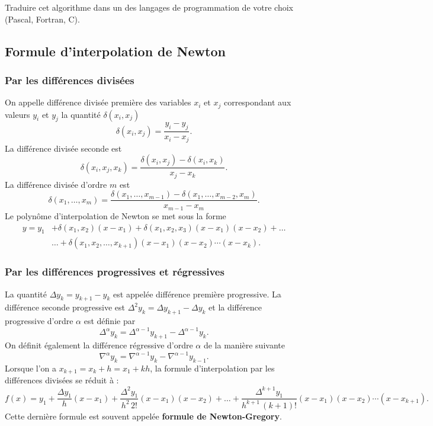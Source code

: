 \begin{exercice}
Traduire cet algorithme dans un des langages de programmation de votre choix
(Pascal, Fortran, C).
\end{exercice}

\subsection{Formule d'interpolation de Newton}

\subsubsection{Par les différences divisées}

On appelle différence divisée première des variables $x_i$ et $x_j$
correspondant aux valeurs $y_i$ et $y_j$ la quantité $\delta(x_i, x_j)$
\[
  \delta(x_i, x_j) = \frac{y_i - y_j}{x_i - x_j} .
\]
La différence divisée seconde est
\[
  \delta(x_i, x_j, x_k) = \frac{\delta(x_i, x_j) - \delta(x_i, x_k)}{x_j - x_k} .
\]
La différence divisée d'ordre $m$ est
\[
  \delta(x_1, \dots, x_m) =
  \frac{\delta(x_1, \dots, x_{m-1}) - \delta(x_1, \dots, x_{m-2}, x_m)}{x_{m-1} - x_m} .
\]
Le polynôme d'interpolation de Newton se met sous la forme
\[
  \begin{aligned}
    y = y_1 &+ \delta(x_1, x_2)(x - x_1) + \delta(x_1, x_2, x_3)(x - x_1)(x - x_2) + \dots\\
            &\dots + \delta(x_1, x_2, \dots, x_{k+1})(x - x_1)(x - x_2)\cdots(x - x_k) .
  \end{aligned}
\]

\subsubsection{Par les différences progressives et régressives}

La quantité $\Delta y_k = y_{k+1} - y_k$ est appelée différence première
progressive. La différence seconde progressive est
$\Delta^2 y_k = \Delta y_{k+1} - \Delta y_k$ et la différence progressive
d'ordre $\alpha$ est définie par
\[
  \Delta^{\alpha} y_k = \Delta^{\alpha-1} y_{k+1} - \Delta^{\alpha-1} y_k .
\]
On définit également la différence régressive d'ordre $\alpha$ de la manière
suivante
\[
  \nabla^{\alpha} y_k = \nabla^{\alpha-1} y_k - \nabla^{\alpha-1} y_{k-1} .
\]
Lorsque l'on a $x_{k+1} = x_k + h = x_1 + kh$, la formule d'interpolation par
les différences divisées se réduit à :
\[
  f(x) = y_1 + \frac{\Delta y_1}{h}(x - x_1)
             + \frac{\Delta^2 y_1}{h^2\,2!}(x - x_1)(x - x_2) + \dots
             + \frac{\Delta^{k+1} y_1}{h^{k+1}\,(k+1)!}(x - x_1)(x - x_2)\cdots(x - x_{k+1}) .
\]
Cette dernière formule est souvent appelée \textbf{formule de
Newton-Gregory}.

